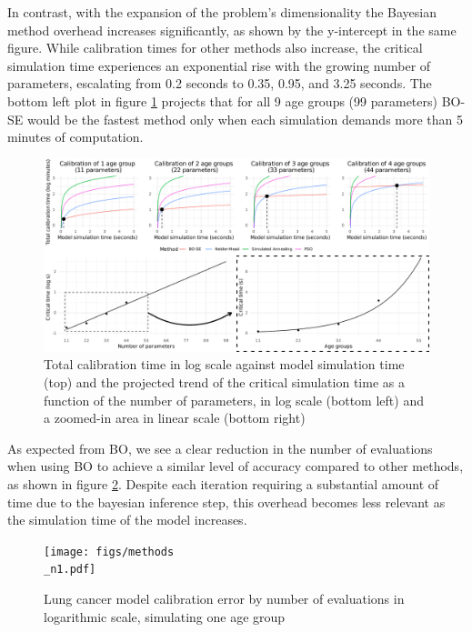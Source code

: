 \documentclass[sn-mathphys,Numbered]{sn-jnl}%
\begin{document}
In contrast, with the expansion of the problem's dimensionality the Bayesian method overhead increases significantly, as shown by the y-intercept in the same figure. While calibration times for other methods also increase, the critical simulation time experiences an exponential rise with the growing number of parameters, escalating from 0.2 seconds to 0.35, 0.95, and 3.25 seconds. The bottom left plot in figure \ref{fig:sim_times} projects that for all 9 age groups (99 parameters) BO-SE would be the fastest method only when each simulation demands more than 5 minutes of computation.

\begin{figure}[h!]
	\centering	
	\includegraphics[width=\textwidth]{figs/crit_times_log.pdf}		
	\caption{Total calibration time in log scale against model simulation time (top) and the projected trend of the critical simulation time as a function of the number of parameters, in log scale (bottom left) and a zoomed-in area in linear scale (bottom right)}
	\label{fig:sim_times}	
\end{figure}

As expected from BO, we see a clear reduction in the number of evaluations when using BO to achieve a similar level of accuracy compared to other methods, as shown in figure \ref{fig:method_comparison}. Despite each iteration requiring a substantial amount of time due to the bayesian inference step, this overhead becomes less relevant as the simulation time of the model increases.

\begin{figure}[h!]
	\centering	
	\texttt{[image: figs/methods\\\_n1.pdf]}		
	\caption{Lung cancer model calibration error by number of evaluations in logarithmic scale, simulating one age group}
	\label{fig:method_comparison}	
\end{figure}
\end{document}
